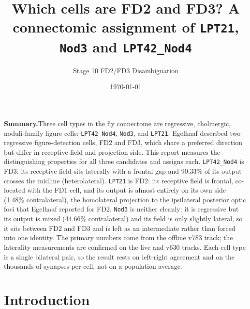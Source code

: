 \documentclass[11pt]{article}
\newcommand{\ttt}[1]{\texttt{#1}}
\begin{document}
\title{\textbf{Which cells are FD2 and FD3? A connectomic assignment of \ttt{LPT21}, \ttt{Nod3} and \ttt{LPT42\_Nod4}}}

\author{Stage 10 FD2/FD3 Disambiguation}

\date{\today}

\maketitle

\tableofcontents

\textbf{Summary.}\quad Three cell types in the fly connectome are regressive, cholinergic, noduli-family figure cells: \ttt{LPT42\_Nod4}, \ttt{Nod3}, and \ttt{LPT21}. Egelhaaf described two regressive figure-detection cells, FD2 and FD3, which share a preferred direction but differ in receptive field and projection side. This report measures the distinguishing properties for all three candidates and assigns each. \ttt{LPT42\_Nod4} is FD3: its receptive field sits laterally with a frontal gap and 90.33\% of its output crosses the midline (heterolateral). \ttt{LPT21} is FD2: its receptive field is frontal, co-located with the FD1 cell, and its output is almost entirely on its own side (1.48\% contralateral), the homolateral projection to the ipsilateral posterior optic foci that Egelhaaf reported for FD2. \ttt{Nod3} is neither cleanly: it is regressive but its output is mixed (44.66\% contralateral) and its field is only slightly lateral, so it sits between FD2 and FD3 and is left as an intermediate rather than forced into one identity. The primary numbers come from the offline v783 track; the laterality measurements are confirmed on the live and v630 tracks. Each cell type is a single bilateral pair, so the result rests on left-right agreement and on the thousands of synapses per cell, not on a population average.

\section{Introduction}
\end{document}
